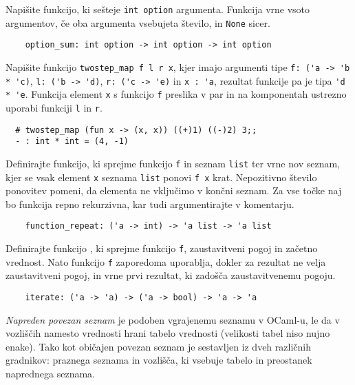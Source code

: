 \documentclass[arhiv]{../izpit}
\begin{document}
	
	

	\naloga 
  
	\podnaloga Napišite funkcijo, ki sešteje \verb|int option| argumenta. Funkcija vrne vsoto argumentov, če oba argumenta vsebujeta število, in \verb|None| sicer.
	\begin{verbatim}
    option_sum: int option -> int option -> int option
	\end{verbatim}  

  \podnaloga Napišite funkcijo \verb|twostep_map f l r x|, kjer imajo argumenti tipe \verb|f: ('a -> 'b * 'c)|, \verb|l: ('b -> 'd)|, \verb|r: ('c -> 'e)| in \verb|x : 'a|, rezultat funkcije pa je tipa \verb|'d * 'e|. Funkcija element \verb|x| s funkcijo \verb|f| preslika v par in na komponentah ustrezno uporabi funkciji \verb|l| in \verb|r|.
  \begin{verbatim}
  # twostep_map (fun x -> (x, x)) ((+)1) ((-)2) 3;;
  - : int * int = (4, -1)
  \end{verbatim}
  
  \podnaloga Definirajte funkcijo, ki sprejme funkcijo \verb|f| in seznam \verb|list| ter vrne nov seznam, kjer se vsak element \verb|x| seznama \verb|list| ponovi \verb|f x| krat. Nepozitivno število ponovitev pomeni, da elementa ne vključimo v končni seznam. Za vse točke naj bo funkcija repno rekurzivna, kar tudi argumentirajte v komentarju.
  \begin{verbatim}
    function_repeat: ('a -> int) -> 'a list -> 'a list
  \end{verbatim}
  
	
	\podnaloga Definirajte funkcijo \verb||, ki sprejme funkcijo \verb|f|, zaustavitveni pogoj in začetno vrednost. Nato funkcijo \verb|f| zaporedoma uporablja, dokler za rezultat ne velja zaustavitveni pogoj, in vrne prvi rezultat, ki zadošča zaustavitvenemu pogoju.
	\begin{verbatim}
    iterate: ('a -> 'a) -> ('a -> bool) -> 'a -> 'a
	\end{verbatim}
  
  \naloga
  
	\textit{Napreden povezan seznam} je podoben vgrajenemu seznamu v OCaml-u, le da v vozliščih namesto vrednosti hrani tabelo vrednosti (velikosti tabel niso nujno enake). Tako kot običajen povezan seznam je sestavljen iz dveh različnih gradnikov: praznega seznama in vozlišča, ki vsebuje tabelo in preostanek naprednega seznama.
	
\end{document}
